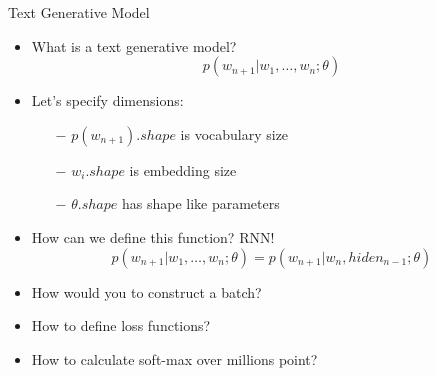 \documentclass{beamer}
\begin{document}
\begin{frame}{Text Generative Model}
	\begin{itemize}
		\item   What is a text generative model?
			   $$p(w_{n+1}|w_1, \dots, w_n; \theta)$$
		\item     Let's specify dimensions:
		\begin{itemize}
			\item[$-$]     $p(w_{n+1}).shape$      is vocabulary size
			\item[$-$]    $w_i.shape$     is embedding size
			\item[$-$]     $\theta.shape$     has shape like parameters
		\end{itemize}
		\item     How can we define this function?    RNN!
		   $$p(w_{n+1}|w_1, \dots, w_n; \theta) = p(w_{n+1}|w_n, hiden_{n-1}; \theta)$$
	\end{itemize}
	 	   \begin{tcolorbox}[enhanced,size=fbox,fontupper=\large\bfseries, colback=black!80, colframe=black!80]
	 		\begin{center}
	 			\text{\textcolor{white}{But, there are several technical problems to apply it}}
	 		\end{center}
	 	\end{tcolorbox}
	 	\begin{itemize}
	 		  \item How would you to construct a batch?
	 		  \item How to define loss functions?
	 		  \item How to calculate soft-max over millions point? 
	 	\end{itemize}
\end{frame}
\end{document}
